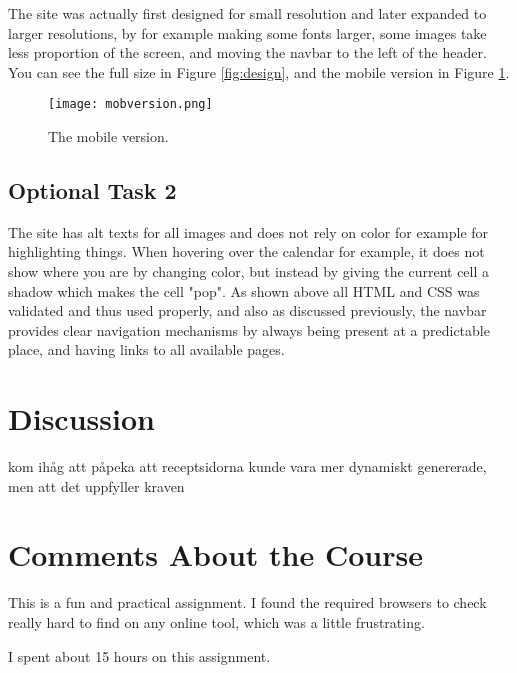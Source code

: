 \documentclass[a4paper]{scrreprt}
\begin{document}
The site was actually first designed for small resolution and later expanded to larger resolutions, by for example making some fonts larger, some images take less proportion of the screen, and moving the navbar to the left of the header. You can see the full size in Figure \ref{fig:design}, and the mobile version in Figure \ref{fig:mobversion}.

\begin{figure}[h!]
  \begin{center}
    \texttt{[image: mobversion.png]}
    \caption{The mobile version.}
    \label{fig:mobversion}
  \end{center}
\end{figure}

\section{Optional Task 2}

The site has alt texts for all images and does not rely on color for example for highlighting things. When hovering over the calendar for example, it does not show where you are by changing color, but instead by giving the current cell a shadow which makes the cell "pop". As shown above all HTML and CSS was validated and thus used properly, and also as discussed previously, the navbar provides clear navigation mechanisms by always being present at a predictable place, and having links to all available pages.

\chapter{Discussion}

kom ihåg att påpeka att receptsidorna kunde vara mer dynamiskt genererade, men att det uppfyller kraven


\chapter{Comments About the Course}

This is a fun and practical assignment. I found the required browsers to check really hard to find on any online tool, which was a little frustrating.

I spent about 15 hours on this assignment.
\end{document}
